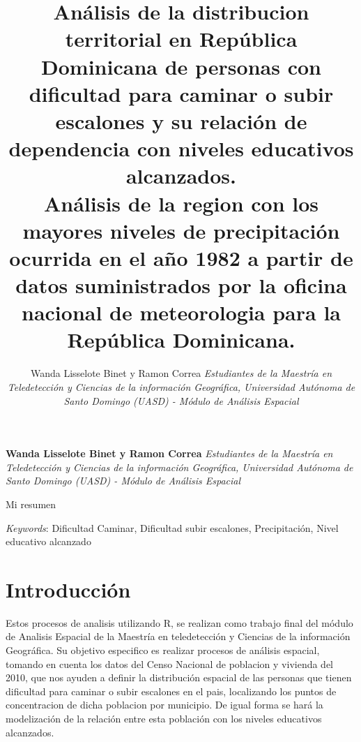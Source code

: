 \documentclass[11pt,]{article}
\title{Análisis de la distribucion territorial en República Dominicana de
personas con dificultad para caminar o subir escalones y su relación de
dependencia con niveles educativos alcanzados.\\
Análisis de la region con los mayores niveles de precipitación ocurrida
en el año 1982 a partir de datos suministrados por la oficina nacional
de meteorologia para la República Dominicana.  }
\author{\Large Wanda Lisselote Binet y Ramon Correa\vspace{0.05in} \newline\normalsize\emph{Estudiantes de la Maestría en Teledetección y Ciencias de la información
Geográfica, Universidad Autónoma de Santo Domingo (UASD) - Módulo de
Análisis Espacial}  }
\date{}
\newcommand*{\authorfont}{\fontfamily{phv}\selectfont}
\renewenvironment{abstract}
 {{%
    \setlength{\leftmargin}{0mm}
    \setlength{\rightmargin}{\leftmargin}%
  }%
  \relax}
 {\endlist}
\begin{document}
	
%

{%
\setlength{\parindent}{0pt}
\thispagestyle{plain}
{\fontsize{18}{20}\selectfont\raggedright 
\maketitle  %

}

{
   \vskip 13.5pt\relax \normalsize\fontsize{11}{12} 
\textbf{\authorfont Wanda Lisselote Binet y Ramon Correa} \hskip 15pt \emph{\small Estudiantes de la Maestría en Teledetección y Ciencias de la información
Geográfica, Universidad Autónoma de Santo Domingo (UASD) - Módulo de
Análisis Espacial}   

}

}








\begin{abstract}

    \hbox{\vrule height .2pt width 39.14pc}

    \vskip 8.5pt %

\noindent Mi resumen


\vskip 8.5pt \noindent \emph{Keywords}: Dificultad Caminar, Dificultad subir escalones, Precipitación, Nivel
educativo alcanzado \par

    \hbox{\vrule height .2pt width 39.14pc}



\end{abstract}


\vskip 6.5pt


\noindent  \section{Introducción}\label{introducciuxf3n}

Estos procesos de analisis utilizando R, se realizan como trabajo final
del módulo de Analisis Espacial de la Maestría en teledetección y
Ciencias de la información Geográfica. Su objetivo especifico es
realizar procesos de análisis espacial, tomando en cuenta los datos del
Censo Nacional de poblacion y vivienda del 2010, que nos ayuden a
definir la distribución espacial de las personas que tienen dificultad
para caminar o subir escalones en el pais, localizando los puntos de
concentracion de dicha poblacion por municipio. De igual forma se hará
la modelización de la relación entre esta población con los niveles
educativos alcanzados.
\end{document}
